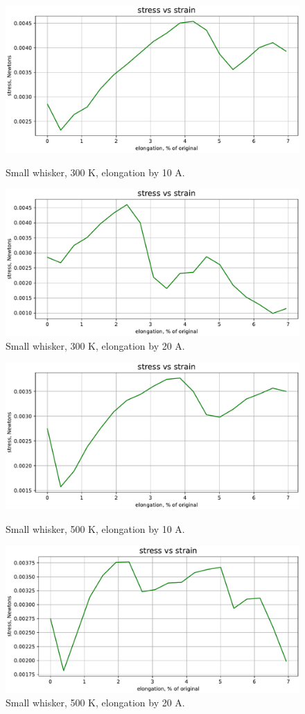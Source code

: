 \documentclass[12pt,a4paper]{article}
\begin{document}
\begin{figure}[h!]
	\centering
	\includegraphics[width=.85\linewidth]{img/milestone09-small-300-10.pdf}
	\caption{Small whisker, 300 K, elongation by 10 A.}
	\includegraphics[width=.85\linewidth]{img/milestone09-small-300-20.pdf}
	\caption{Small whisker, 300 K, elongation by 20 A.}
	\label{fig:whisker-300}
\end{figure}

\begin{figure}[h!]
	\centering
	\includegraphics[width=.85\linewidth]{img/milestone09-small-500-10.pdf}
	\caption{Small whisker, 500 K, elongation by 10 A.}
	\includegraphics[width=.85\linewidth]{img/milestone09-small-500-20.pdf}
	\caption{Small whisker, 500 K, elongation by 20 A.}
	\label{fig:whisker-500}
\end{figure}
\end{document}
